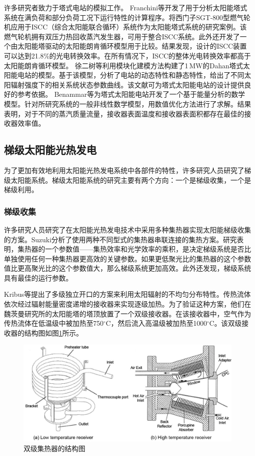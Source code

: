 许多研究者致力于塔式电站的模拟工作。
Franchini等\cite{Franchini2013}开发了用于分析太阳能塔式系统在满负荷和部分负荷工况下运行特性的计算程序。将西门子SGT-800型燃气轮机应用于ISCC（综合太阳能联合循环）系统作为太阳能塔式系统的研究案例。该燃气轮机拥有双压力热回收蒸汽发生器，可用于整合ISCC系统。此外还开发了一个由太阳能塔驱动的太阳能朗肯循环模型用于比较。结果发现，设计的ISCC装置可以达到21.8\%的光电转换效率。在所有情况下，ISCC的整体光电转换效率都高于太阳能朗肯循环模型。
徐二树等\cite{Xu2011a,Xu2012}利用模块化建模方法构建了1$\,\mathrm{MW}$的Dahan塔式太阳能电站的模型。基于该模型，分析了电站的动态特性和静态特性，给出了不同太阳辐射强度下的相关系统状态参数曲线。该文献可为塔式太阳能电站的设计提供良好的参考依据。
Benammar等\cite{Benammar2014}为塔式太阳能电站开发了一个基于能量分析的数学模型。针对所研究系统的一般非线性数学模型，用数值优化方法进行了求解。结果表明，对于不同的蒸汽质量流量，接收器表面温度和接收器表面积都存在最佳的接收器效率值。

\subsection{梯级太阳能光热发电}
\label{sec:cs}

为了更加有效地利用太阳能光热发电系统中各部件的特性，许多研究人员研究了梯级太阳能系统。梯级太阳能系统的研究主要有两个方向：一个是梯级收集，一个是梯级利用。

\subsubsection{梯级收集}

许多研究人员研究了在太阳能光热发电技术中采用多种集热器实现太阳能梯级收集的方案。Suzuki\cite{Suzuki1986}分析了使用两种不同型式的集热器串联连接的集热方案。研究表明，集热器的一个参数值——集热效率和光学效率的乘积，是决定梯级系统是否比单独使用任何一种集热器更高效的关键参数。如果更低聚光比的集热器的这个参数值比更高聚光比的这个参数值大，那么梯级系统更加高效。此外还发现，梯级系统具有最佳的运行参数。

Kribus等\cite{Kribus1999}提出了多级独立开口的方案来利用太阳辐射的不均匀分布特性。传热流体依次经过辐射能量密度递增的接收器来实现逐级加热。为了验证这种方案，他们在魏茨曼研究所的太阳能塔的塔顶放置了一个双级接收器。在该接收器中，空气作为传热流体在低温级中被加热至750$\mathrm{^\circ C}$，然后流入高温级被加热至1000$\mathrm{^\circ C}$。该双级接收器的结构图如图\ref{fig:Kribus1999}所示。

\begin{figure}[!ht]
\centering
\includegraphics[width=.8\textwidth]{fig/Kribus1999.jpg}
\caption{双级集热器的结构图}
\label{fig:Kribus1999}
\end{figure}

